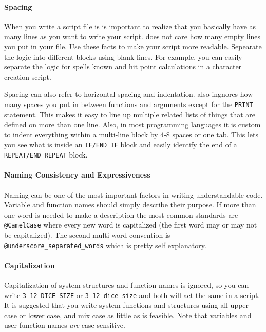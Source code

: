 \paragraph*{Spacing\\}
\hspace*{\parindent}%
When you write a script file is is important to realize that you basically
have as many lines as you want to write your script. \progLogo does not care
how many empty lines you put in your file. Use these facts to make your
script more readable. Sepearate the logic into different blocks using blank
lines. For example, you can easily separate the logic for spells known and 
hit point calculations in a character creation script.

Spacing can also refer to horizontal spacing and indentation. \progLogo also
ingnores how many spaces you put in between functions and arguments except
for the \texttt{PRINT} statement. This makes it easy to line up multiple
related lists of things that are defined on more than one line. Also, in
most programming languages it is custom to indent everything within
a multi-line block by 4-8 spaces or one tab. This lets you see what is inside
an \texttt{IF/END IF} block and easily identify the end of a \texttt{REPEAT/END
REPEAT} block.

\paragraph*{Naming Consistency and Expressiveness\\}
\hspace*{\parindent}%
Naming can be one of the most important factors in writing understandable code.
Variable and function names should simply describe their purpose. If more than
one word is needed to make a description the most common standards are
\texttt{@CamelCase} where every new word is capitalized (the first word may or
may not be capitalized). The second multi-word convention is
\texttt{@underscore\_separated\_words} which is pretty self explanatory.

\paragraph*{Capitalization\\}
\hspace*{\parindent}%
Capitalization of system structures and function names is ignored, so you can
write \texttt{3 12 DICE SIZE} or \texttt{3 12 dice size} and both will act
the same in a script. It is suggested that you write system functions and
structures using all upper case or lower case, and mix case as little as is
feasible. Note that variables and user function names \emph{are} case sensitive.

